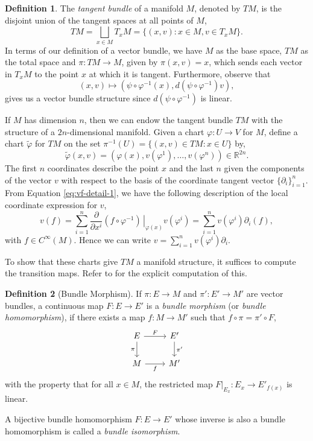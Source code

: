 \documentclass[12pt,a4paper]{article}
\numberwithin{equation}{section}
\theoremstyle{definition}
\newtheorem{definition}{Definition}[section]
\theoremstyle{remark}
\begin{document}
\begin{definition}
The \textit{tangent bundle} of a manifold $M$, denoted by $TM$, is the disjoint union of the tangent spaces at all points of $M$,
\[
TM=\bigsqcup_{x\in M}T_xM=\{(x,v):x\in M,v\in T_xM\}.
\]
In terms of our definition of a vector bundle, we have $M$ as the base space, $TM$ as the total space and $\pi:TM\to M$, given by $\pi(x,v)=x$, which sends each vector in $T_xM$ to the point $x$ at which it is tangent. Furthermore, observe that
\[
(x,v)\mapsto \left(\psi\circ\varphi^{-1}(x),d(\psi\circ\varphi^{-1})v \right),
\]
gives us a vector bundle structure since $d(\psi\circ\varphi^{-1})$ is linear.
\end{definition}
If $M$ has dimension $n$, then we can endow the tangent bundle $TM$ with the structure of a $2n$-dimensional manifold. Given a chart $\varphi:U\to V$ for $M$, define a chart $\tilde{\varphi}$ for $TM$ on the set $\pi^{-1}(U)=\{(x,v)\in TM:x\in U\}$ by,
\[
\tilde{\varphi}(x,v)=\left(\varphi(x),v(\varphi^1),\ldots,v(\varphi^n) \right)\in\mathbb{R}^{2n}.
\]
The first $n$ coordinates describe the point $x$ and the last $n$ given the components of the vector $v$ with respect to the basis of the coordinate tangent vector $\{\partial_i\}_{i=1}^{n}$. From Equation \eqref{eq:vf-detail-1}, we have the following description of the local coordinate expression for $v$,
\[
v(f)=\sum_{i=1}^n\frac{\partial}{\partial x^i}\left.\left(f\circ\varphi^{-1}\right)\,\right\rvert_{\varphi(x)}v(\varphi^i)=\sum_{i=1}^nv(\varphi^i)\partial_i(f),
\]
with $f\in C^{\infty}(M)$. Hence we can write $v=\sum_{i=1}^nv(\varphi^i)\partial_i$.

To show that these charts give $TM$ a manifold structure, it suffices to compute the transition maps. Refer to \cite{MR2954043} for the explicit computation of this.


\begin{definition}[Bundle Morphism]
If $\pi:E\to M$ and $\pi':E'\to M'$ are vector bundles, a continuous map $F:E\to E'$ is a \textit{bundle morphism} (or \textit{bundle homomorphism}), if there exists a map $f:M\to M'$ such that $f\circ\pi=\pi'\circ F$,
\[
\begin{tikzcd}
E \arrow[r,"F"] \arrow{d}[swap]{\pi}
& E' \arrow[d,"\pi'"] \\
M \arrow{r}[swap]{f} & M'
\end{tikzcd}
\]
with the property that for all $x\in M$, the restricted map $F\rvert_{E_x}:E_x\to E'_{f(x)}$ is linear.

A bijective bundle homomorphism $F:E\to E'$ whose inverse is also a bundle homomorphism is called a \textit{bundle isomorphism}.
\end{definition}
\end{document}

